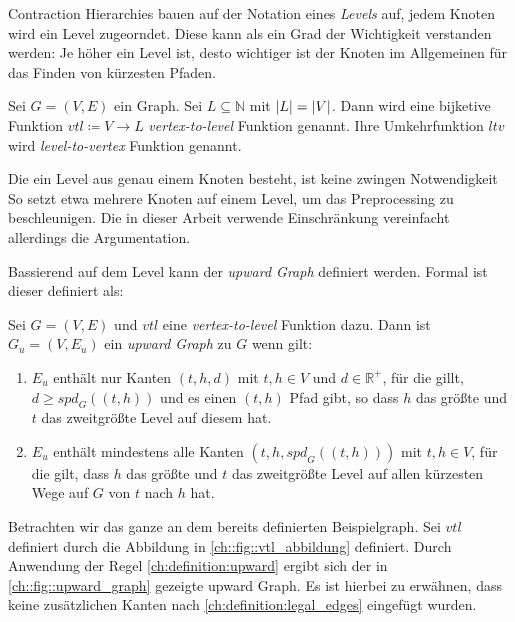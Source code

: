 Contraction Hierarchies bauen auf der Notation eines \emph{Levels} auf, jedem Knoten wird ein Level zugeorndet.
Diese kann als ein Grad der Wichtigkeit verstanden werden:
Je höher ein Level ist, desto wichtiger ist der Knoten im Allgemeinen für das Finden von kürzesten Pfaden.

\begin{definition}[Level]
    Sei $G = (V, E)$ ein Graph.
    Sei $L \subseteq \mathbb{N}$ mit $\abs{L} = \abs{V}$.
    Dann wird eine bijketive Funktion ${vtl} \coloneq V \to L$ \emph{vertex-to-level} Funktion genannt.
    Ihre Umkehrfunktion ${ltv}$ wird \emph{level-to-vertex} Funktion genannt.
\end{definition}

Die ein Level aus genau einem Knoten besteht, ist keine zwingen Notwendigkeit
So setzt \cite{vetter2009parallel} etwa mehrere Knoten auf einem Level, um das Preprocessing zu beschleunigen.
Die in dieser Arbeit verwende Einschränkung vereinfacht allerdings die Argumentation.

Bassierend auf dem Level kann der \emph{upward Graph} definiert werden.
Formal ist dieser definiert als:

\begin{definition}
    Sei $G = (V, E)$ und ${vtl}$ eine \emph{vertex-to-level} Funktion dazu. Dann ist $G_u = (V, E_u)$ ein \emph{upward Graph} zu $G$ wenn gilt:
    \begin{enumerate}
        \item\label{ch:definition:legal_edges}
        $E_u$ enthält nur Kanten $(t, h, d)$ mit $t, h \in V$ und $d \in \mathbb{R}^+$, für die gillt, $d \geq {spd}_{G}((t, h))$ und es einen $(t, h)$ Pfad gibt, so dass $h$ das größte und $t$ das zweitgrößte Level auf diesem hat.

        \item\label{ch:definition:upward}
        $E_u$ enthält mindestens alle Kanten $(t, h, {spd}_{G}((t, h)))$ mit $t, h \in V$, für die gilt, dass $h$ das größte und $t$ das zweitgrößte Level auf allen kürzesten Wege auf $G$ von $t$ nach $h$ hat.
    \end{enumerate}
\end{definition}


Betrachten wir das ganze an dem bereits definierten Beispielgraph.
Sei ${vtl}$ definiert durch die Abbildung in \autoref{ch::fig::vtl_abbildung} definiert.
Durch Anwendung der Regel \ref{ch:definition:upward} ergibt sich der in \autoref{ch::fig::upward_graph} gezeigte upward Graph.
Es ist hierbei zu erwähnen, dass keine zusätzlichen Kanten nach \autoref{ch:definition:legal_edges} eingefügt wurden.

